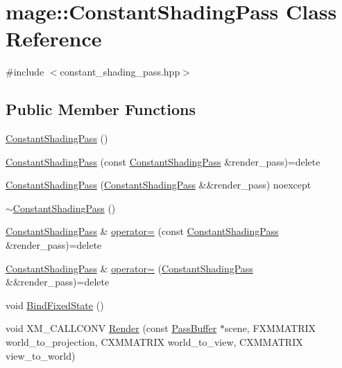 \hypertarget{classmage_1_1_constant_shading_pass}{}\section{mage\+:\+:Constant\+Shading\+Pass Class Reference}
\label{classmage_1_1_constant_shading_pass}


{\ttfamily \#include $<$constant\+\_\+shading\+\_\+pass.\+hpp$>$}

\subsection*{Public Member Functions}
\begin{DoxyCompactItemize}
\item 
\hyperlink{classmage_1_1_constant_shading_pass_a21a8614cd67999bec82d260eb9aa78d7}{Constant\+Shading\+Pass} ()
\item 
\hyperlink{classmage_1_1_constant_shading_pass_a0dd8af518c8f6444368d64f9e24a3a13}{Constant\+Shading\+Pass} (const \hyperlink{classmage_1_1_constant_shading_pass}{Constant\+Shading\+Pass} \&render\+\_\+pass)=delete
\item 
\hyperlink{classmage_1_1_constant_shading_pass_a67b6af1402885092fbcc1aa5d4cf4be5}{Constant\+Shading\+Pass} (\hyperlink{classmage_1_1_constant_shading_pass}{Constant\+Shading\+Pass} \&\&render\+\_\+pass) noexcept
\item 
\hyperlink{classmage_1_1_constant_shading_pass_a2ef56dc45910519d5e0137b14768738e}{$\sim$\+Constant\+Shading\+Pass} ()
\item 
\hyperlink{classmage_1_1_constant_shading_pass}{Constant\+Shading\+Pass} \& \hyperlink{classmage_1_1_constant_shading_pass_ada08b06e66c1d1da2f869b96b71f3202}{operator=} (const \hyperlink{classmage_1_1_constant_shading_pass}{Constant\+Shading\+Pass} \&render\+\_\+pass)=delete
\item 
\hyperlink{classmage_1_1_constant_shading_pass}{Constant\+Shading\+Pass} \& \hyperlink{classmage_1_1_constant_shading_pass_ae5ea38d9739b1a16257ee0a69c95b406}{operator=} (\hyperlink{classmage_1_1_constant_shading_pass}{Constant\+Shading\+Pass} \&\&render\+\_\+pass)=delete
\item 
void \hyperlink{classmage_1_1_constant_shading_pass_ab8d40634d0cd224c97ccb8dfbe43d45e}{Bind\+Fixed\+State} ()
\item 
void X\+M\+\_\+\+C\+A\+L\+L\+C\+O\+NV \hyperlink{classmage_1_1_constant_shading_pass_adfa9c8d7d723d2e5c1b49b2c3e34de46}{Render} (const \hyperlink{structmage_1_1_pass_buffer}{Pass\+Buffer} $\ast$scene, F\+X\+M\+M\+A\+T\+R\+IX world\+\_\+to\+\_\+projection, C\+X\+M\+M\+A\+T\+R\+IX world\+\_\+to\+\_\+view, C\+X\+M\+M\+A\+T\+R\+IX view\+\_\+to\+\_\+world)
\end{DoxyCompactItemize}
